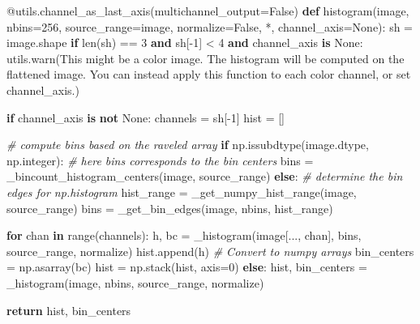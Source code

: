 \documentclass[11pt]{article}
\newenvironment{Shaded}{}{}
\newcommand{\KeywordTok}[1]{\textcolor[rgb]{0.00,0.44,0.13}{\textbf{{#1}}}}
\newcommand{\DecValTok}[1]{\textcolor[rgb]{0.25,0.63,0.44}{{#1}}}
\newcommand{\StringTok}[1]{\textcolor[rgb]{0.25,0.44,0.63}{{#1}}}
\newcommand{\CommentTok}[1]{\textcolor[rgb]{0.38,0.63,0.69}{\textit{{#1}}}}
\newcommand{\NormalTok}[1]{{#1}}
\newcommand{\VariableTok}[1]{\textcolor[rgb]{0.10,0.09,0.49}{{#1}}}
\newcommand{\ControlFlowTok}[1]{\textcolor[rgb]{0.00,0.44,0.13}{\textbf{{#1}}}}
\newcommand{\OperatorTok}[1]{\textcolor[rgb]{0.40,0.40,0.40}{{#1}}}
\newcommand{\BuiltInTok}[1]{{#1}}
\newcommand{\AttributeTok}[1]{\textcolor[rgb]{0.49,0.56,0.16}{{#1}}}
\begin{document}
\begin{Shaded}
\begin{Highlighting}[]
\AttributeTok{@utils.channel\_as\_last\_axis}\NormalTok{(multichannel\_output}\OperatorTok{=}\VariableTok{False}\NormalTok{)}
\KeywordTok{def}\NormalTok{ histogram(image, nbins}\OperatorTok{=}\DecValTok{256}\NormalTok{, source\_range}\OperatorTok{=}\StringTok{\textquotesingle{}image\textquotesingle{}}\NormalTok{, normalize}\OperatorTok{=}\VariableTok{False}\NormalTok{, }\OperatorTok{*}\NormalTok{,}
\NormalTok{              channel\_axis}\OperatorTok{=}\VariableTok{None}\NormalTok{):}
\NormalTok{    sh }\OperatorTok{=}\NormalTok{ image.shape}
    \ControlFlowTok{if} \BuiltInTok{len}\NormalTok{(sh) }\OperatorTok{==} \DecValTok{3} \KeywordTok{and}\NormalTok{ sh[}\OperatorTok{{-}}\DecValTok{1}\NormalTok{] }\OperatorTok{\textless{}} \DecValTok{4} \KeywordTok{and}\NormalTok{ channel\_axis }\KeywordTok{is} \VariableTok{None}\NormalTok{:}
\NormalTok{        utils.warn(}\StringTok{\textquotesingle{}This might be a color image. The histogram will be \textquotesingle{}}
                   \StringTok{\textquotesingle{}computed on the flattened image. You can instead \textquotesingle{}}
                   \StringTok{\textquotesingle{}apply this function to each color channel, or set \textquotesingle{}}
                   \StringTok{\textquotesingle{}channel\_axis.\textquotesingle{}}\NormalTok{)}

    \ControlFlowTok{if}\NormalTok{ channel\_axis }\KeywordTok{is} \KeywordTok{not} \VariableTok{None}\NormalTok{:}
\NormalTok{        channels }\OperatorTok{=}\NormalTok{ sh[}\OperatorTok{{-}}\DecValTok{1}\NormalTok{]}
\NormalTok{        hist }\OperatorTok{=}\NormalTok{ []}

        \CommentTok{\# compute bins based on the raveled array}
        \ControlFlowTok{if}\NormalTok{ np.issubdtype(image.dtype, np.integer):}
            \CommentTok{\# here bins corresponds to the bin centers}
\NormalTok{            bins }\OperatorTok{=}\NormalTok{ \_bincount\_histogram\_centers(image, source\_range)}
        \ControlFlowTok{else}\NormalTok{:}
            \CommentTok{\# determine the bin edges for np.histogram}
\NormalTok{            hist\_range }\OperatorTok{=}\NormalTok{ \_get\_numpy\_hist\_range(image, source\_range)}
\NormalTok{            bins }\OperatorTok{=}\NormalTok{ \_get\_bin\_edges(image, nbins, hist\_range)}

        \ControlFlowTok{for}\NormalTok{ chan }\KeywordTok{in} \BuiltInTok{range}\NormalTok{(channels):}
\NormalTok{            h, bc }\OperatorTok{=}\NormalTok{ \_histogram(image[..., chan], bins, source\_range, normalize)}
\NormalTok{            hist.append(h)}
        \CommentTok{\# Convert to numpy arrays}
\NormalTok{        bin\_centers }\OperatorTok{=}\NormalTok{ np.asarray(bc)}
\NormalTok{        hist }\OperatorTok{=}\NormalTok{ np.stack(hist, axis}\OperatorTok{=}\DecValTok{0}\NormalTok{)}
    \ControlFlowTok{else}\NormalTok{:}
\NormalTok{        hist, bin\_centers }\OperatorTok{=}\NormalTok{ \_histogram(image, nbins, source\_range, normalize)}

    \ControlFlowTok{return}\NormalTok{ hist, bin\_centers}
\end{Highlighting}
\end{Shaded}
\end{document}
